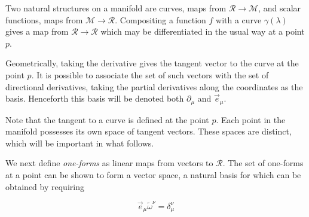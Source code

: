Two natural structures on a manifold are curves, maps from
$\mathcal{R}\to\mathcal{M}$, and scalar functions,  maps from
$\mathcal{M}\to\mathcal{R}$.  Compositing a function $f$ with a curve
$\gamma(\lambda)$ gives a map from $\mathcal{R} \rightarrow
\mathcal{R}$ which may be differentiated in the usual way at a point
$p$.

Geometrically, taking the derivative gives the tangent vector to the
curve at the point $p$.  It is possible to associate the set of such
vectors with the set of directional derivatives, taking the partial
derivatives along the coordinates as the basis.  Henceforth this basis
will be denoted both $\partial_\mu$ and $\vec{e}_\mu$.

Note that the tangent to a curve is defined at the point $p$.  Each
point in the manifold possesses its own space of tangent vectors.
These spaces are distinct, which will be important in what follows.

We next define \emph{one-forms} as linear maps from vectors to
$\mathcal{R}$.  The set of one-forms at a point can be shown to form a
vector space, a natural basis for which can be obtained by requiring

\begin{equation*}
\vec{e}_\mu \tilde{\omega}^\nu = \delta_\mu^\nu
\end{equation*}

